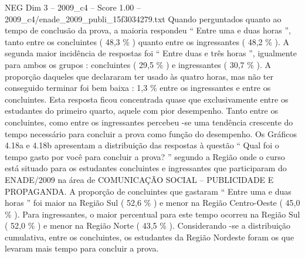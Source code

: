\begin{textsample}{NEG Dim 3 – 2009\_c4 – Score 1.00 – 2009\_c4/enade\_2009\_publi\_15f3034279.txt}
Quando perguntados quanto ao tempo de conclusão da prova, a maioria respondeu “ Entre uma e duas horas ”, tanto entre os concluintes ( 48,3 \% ) quanto entre os ingressantes ( 48,2 \% ).
A segunda maior incidência de respostas foi “ Entre duas e três horas ”, igualmente para ambos os grupos : concluintes ( 29,5 \% ) e ingressantes ( 30,7 \% ).
A proporção daqueles que declararam ter usado às quatro horas, mas não ter conseguido terminar foi bem baixa : 1,3 \% entre os ingressantes e entre os concluintes.
Esta resposta ficou concentrada quase que exclusivamente entre os estudantes do primeiro quarto, aquele com pior desempenho.
Tanto entre os concluintes, como entre os ingressantes percebeu -se uma tendência crescente do tempo necessário para concluir a prova como função do desempenho.
Os Gráficos 4.18a e 4.18b apresentam a distribuição das respostas à questão “ Qual foi o tempo gasto por você para concluir a prova? ” segundo a Região onde o curso está situado para os estudantes concluintes e ingressantes que participaram do ENADE/2009 na área de COMUNICAÇÃO SOCIAL – PUBLICIDADE E PROPAGANDA.
A proporção de concluintes que gastaram “ Entre uma e duas horas ” foi maior na Região Sul ( 52,6 \% ) e menor na Região Centro-Oeste ( 45,0 \% ).
Para ingressantes, o maior percentual para este tempo ocorreu na Região Sul ( 52,0 \% ) e menor na Região Norte ( 43,5 \% ).
Considerando -se a distribuição cumulativa, entre os concluintes, os estudantes da Região Nordeste foram os que levaram mais tempo para concluir a prova.

\end{textsample}
